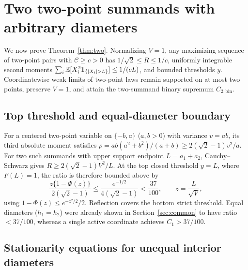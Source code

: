 \section{Two two-point summands with arbitrary diameters}\label{sec:two}

We now prove Theorem~\ref{thm:two}. Normalizing $V=1$, any maximizing
sequence of two-point pairs with $\mathcal C\ge c>0$ has $1/\sqrt2\le R\le1/c$,
uniformly integrable second moments $\sum_i\E[X_i^2\ind_{\{|X_i|>L\}}]\le1/(cL)$,
and bounded thresholds $y$. Coordinatewise weak limits of two-point laws
remain supported on at most two points, preserve $V=1$, and attain the
two-summand binary supremum $C_{2,\mathrm{bin}}$.

\subsection{Top threshold and equal-diameter boundary}

For a centered two-point variable on $\{-b,a\}$ ($a,b>0$) with variance
$v=ab$, its third absolute moment satisfies
$\rho=ab(a^2+b^2)/(a+b)\ge2(\sqrt2-1)v^2/a$. For two such summands with upper
support endpoint $L=a_1+a_2$, Cauchy--Schwarz gives $R\ge2(\sqrt2-1)V^2/L$.
At the top closed threshold $y=L$, where $F(L)=1$, the ratio is therefore
bounded above by
\[
 \frac{z\{1-\Phi(z)\}}{2(\sqrt2-1)}
 \le\frac{e^{-1/2}}{4(\sqrt2-1)}<\frac{37}{100},
 \qquad z=\frac{L}{\sqrt V},
\]
using $1-\Phi(z)\le e^{-z^2/2}/2$. Reflection covers the bottom strict
threshold. Equal diameters ($h_1=h_2$) were already shown in
Section~\ref{sec:common} to have ratio $<37/100$, whereas a single active
coordinate achieves $C_1>37/100$.

\subsection{Stationarity equations for unequal interior diameters}

